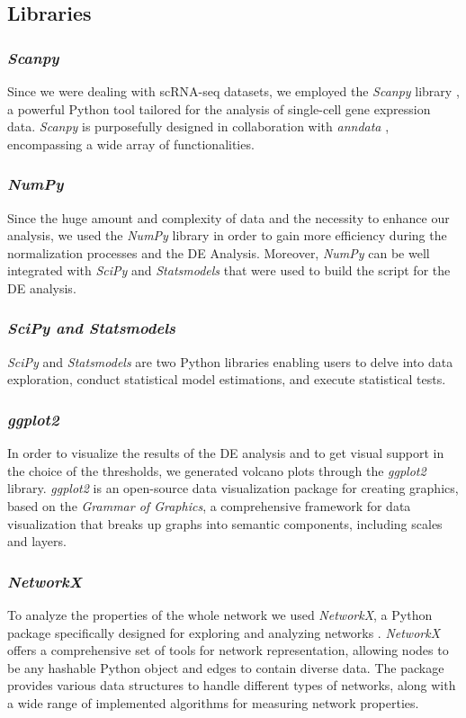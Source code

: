 \documentclass[10pt]{SelfArx} %
\begin{document}
\subsection{Libraries}
\subsubsection*{\textit{Scanpy}}
Since we were dealing with scRNA-seq datasets, we employed the \textit{Scanpy} library \cite{wolf2018scanpy}, a powerful Python tool tailored for the analysis of single-cell gene expression data. \textit{Scanpy} is purposefully designed in collaboration with \textit{anndata} \cite{virshup2021anndata}, encompassing a wide array of functionalities.

\subsubsection*{\textit{NumPy}}
Since the huge amount and complexity of data and the necessity to enhance our analysis, we used the \textit{NumPy} \cite{harris2020array} library in order to gain more efficiency during the normalization processes and the DE Analysis. Moreover, \textit{NumPy} can be well integrated with \textit{SciPy} and \textit{Statsmodels} that were used to build the script for the DE analysis. 

\subsubsection*{\textit{SciPy and Statsmodels}}
\textit{SciPy} \cite{jones2001scipy} and \textit{Statsmodels} \cite{seabold2010statsmodels} are two Python libraries enabling users to delve into data exploration, conduct statistical model estimations, and execute statistical tests.

\subsubsection*{\textit{ggplot2}}
In order to visualize the results of the DE analysis and to get visual support in the choice of the thresholds, we generated volcano plots through the \textit{ggplot2} library. \textit{ggplot2} is an open-source data visualization package for creating graphics, based on the \textit{Grammar of Graphics}, a comprehensive framework for data visualization that breaks up graphs into semantic components, including scales and layers.

\subsubsection*{\textit{NetworkX}}\label{sec:networkX}
To analyze the properties of the whole network we used \textit{\textit{NetworkX}}, a Python package specifically designed for exploring and analyzing networks \cite{hagberg2008exploring}. \textit{NetworkX} offers a comprehensive set of tools for network representation, allowing nodes to be any hashable Python object and edges to contain diverse data. The package provides various data structures to handle different types of networks, along with a wide range of implemented algorithms for measuring network properties. 
\end{document}
